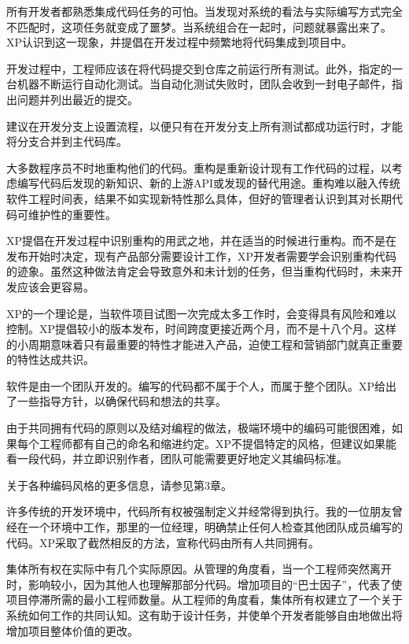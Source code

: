 所有开发者都熟悉集成代码任务的可怕。当发现对系统的看法与实际编写方式完全不匹配时，这项任务就变成了噩梦。当系统组合在一起时，问题就暴露出来了。XP认识到这一现象，并提倡在开发过程中频繁地将代码集成到项目中。

开发过程中，工程师应该在将代码提交到仓库之前运行所有测试。此外，指定的一台机器不断运行自动化测试。当自动化测试失败时，团队会收到一封电子邮件，指出问题并列出最近的提交。

建议在开发分支上设置流程，以便只有在开发分支上所有测试都成功运行时，才能将分支合并到主代码库。


大多数程序员不时地重构他们的代码。重构是重新设计现有工作代码的过程，以考虑编写代码后发现的新知识、新的上游API或发现的替代用途。重构难以融入传统软件工程时间表，结果不如实现新特性那么具体，但好的管理者认识到其对长期代码可维护性的重要性。

XP提倡在开发过程中识别重构的用武之地，并在适当的时候进行重构。而不是在发布开始时决定，现有产品部分需要设计工作，XP开发者需要学会识别重构代码的迹象。虽然这种做法肯定会导致意外和未计划的任务，但当重构代码时，未来开发应该会更容易。


XP的一个理论是，当软件项目试图一次完成太多工作时，会变得具有风险和难以控制。XP提倡较小的版本发布，时间跨度更接近两个月，而不是十八个月。这样的小周期意味着只有最重要的特性才能进入产品，迫使工程和营销部门就真正重要的特性达成共识。


软件是由一个团队开发的。编写的代码都不属于个人，而属于整个团队。XP给出了一些指导方针，以确保代码和想法的共享。


由于共同拥有代码的原则以及结对编程的做法，极端环境中的编码可能很困难，如果每个工程师都有自己的命名和缩进约定。XP不提倡特定的风格，但建议如果能看一段代码，并立即识别作者，团队可能需要更好地定义其编码标准。

关于各种编码风格的更多信息，请参见第3章。


许多传统的开发环境中，代码所有权被强制定义并经常得到执行。我的一位朋友曾经在一个环境中工作，那里的一位经理，明确禁止任何人检查其他团队成员编写的代码。XP采取了截然相反的方法，宣称代码由所有人共同拥有。

集体所有权在实际中有几个实际原因。从管理的角度看，当一个工程师突然离开时，影响较小，因为其他人也理解那部分代码。增加项目的“巴士因子”，代表了使项目停滞所需的最小工程师数量。从工程师的角度看，集体所有权建立了一个关于系统如何工作的共同认知。这有助于设计任务，并使单个开发者能够自由地做出将增加项目整体价值的更改。

